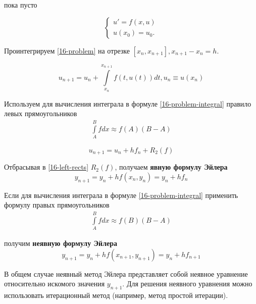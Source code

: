\begin{col-answer-preambule}
	\begin{plan}
    \item пока пусто
	\end{plan}
\end{col-answer-preambule}


\begin{equation}
  \label{16-problem}
  \begin{cases}
    u' = f(x, u)\\
    u(x_0) = u_0.
  \end{cases}
\end{equation}

Проинтегрируем \eqref{16-problem} на отрезке $[x_n, x_{n + 1}], x_{n + 1} - x_n = h$.

\begin{equation}
  \label{16-problem-integral}
  u_{n + 1} = u_n + \int\limits_{x_n}^{x_{n + 1}}f(t, u(t))dt, u_n \equiv u(x_n)
\end{equation}

Используем для вычисления интеграла в формуле \eqref{16-problem-integral}
правило левых прямоугольников
\begin{align*}
  \int\limits_A^Bfdx \approx f(A)(B - A)
\end{align*}

\begin{equation}
  \label{16-left-rects}
  u_{n + 1} = u_n + hf_n + R_2(f)
\end{equation}

Отбрасывая в \eqref{16-left-rects} $R_2(f)$, получаем
\textbf{явную формулу Эйлера}
\begin{equation}
  y_{n + 1} = y_n + hf(x_n, y_n) = y_n + hf_n
\end{equation}

Если для вычисления интеграла в формуле \eqref{16-problem-integral} применить
формулу правых прямоугольников
\begin{align*}
  \int\limits_A^Bfdx \approx f(B)(B - A)
\end{align*}

получим \textbf{неявную формулу Эйлера}
\begin{equation}
  y_{n + 1} = y_n + hf(x_{n + 1}, y_{n + 1}) = y_n + hf_{n + 1}
\end{equation}

В общем случае неявный метод Эйлера представляет собой неявное уравнение
относительно искомого значения $y_{n + 1}$. Для решения неявного уравнения можно
использовать итерационный метод (например, метод простой итерации).

